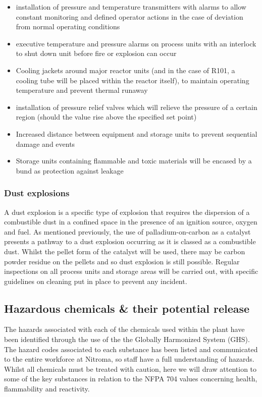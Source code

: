 \begin{itemize}
\item installation of pressure and temperature transmitters with alarms to allow constant monitoring and defined operator actions in the case of deviation from normal operating conditions
         \item executive temperature and pressure alarms on process units with an interlock to shut down unit before fire or explosion can occur 
         \item Cooling jackets around major reactor units (and in the case of R101, a cooling tube will be placed within the reactor itself), to maintain operating temperature and prevent thermal runaway 
          \item installation of pressure relief valves which will relieve the pressure of a certain region (should the value rise above the specified set point)
    \item Increased distance between equipment and storage units to prevent sequential damage and events
    \item Storage units containing flammable and toxic materials will be encased by a bund as protection against leakage
\end{itemize}


\subsubsection{Dust explosions}

A dust explosion is a specific type of explosion that requires the dispersion of a combustible dust in a confined space in the presence of an ignition source, oxygen and fuel. As mentioned previously, the use of palladium-on-carbon as a catalyst presents a pathway to a dust explosion occurring as it is classed as a combustible dust. Whilst the pellet form of the catalyst will be used, there may be carbon powder residue on the pellets and so dust explosion is still possible. Regular inspections on all process units and storage areas will be carried out, with specific guidelines on cleaning put in place to prevent any incident. 



\subsection{Hazardous chemicals \& their potential release}

The hazards associated with each of the chemicals used within the plant have  been identified through the use of the the Globally Harmonized System (GHS). The hazard codes associated to each substance has been listed and communicated to the entire workforce at Nitroma, so staff have a full understanding of hazards. Whilst all chemicals must be treated with caution, here we will draw attention to some of the key substances in relation to the NFPA 704 values concerning health, flammability and reactivity. 

